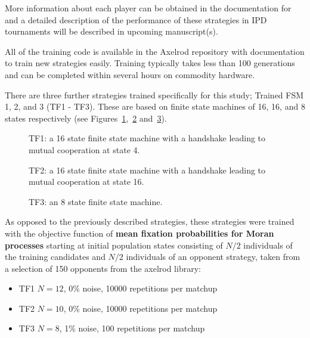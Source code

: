 \documentclass{article}
\begin{document}
More information about each player can be obtained in the documentation for
\cite{axelrodproject} and a detailed description of the performance
 of these strategies in IPD tournaments will be described in upcoming manuscript(s).

All of the training code is available in the
Axelrod repository with documentation to train new strategies easily. Training
typically takes less than 100 generations and can be completed within several
hours on commodity hardware.

There are three further strategies trained specifically for this study; Trained
FSM 1, 2, and 3 (TF1 - TF3). These are based on finite state machines of 16, 16,
and 8 states respectively (see Figures~\ref{fig:tf1},~\ref{fig:tf2}
and~\ref{fig:tf3}).


\begin{figure}[!hbtp]
    \centering
    
    \caption{TF1: a 16 state finite state machine with a handshake leading to
    mutual cooperation at state 4.}
    \label{fig:tf1}
\end{figure}


\begin{figure}[!hbtp]
    \centering
    
    \caption{TF2: a 16 state finite state machine with a handshake leading to
    mutual cooperation at state 16.}
    \label{fig:tf2}
\end{figure}


\begin{figure}[!hbtp]
    \centering
    
    \caption{TF3: an 8 state finite state machine.}
    \label{fig:tf3}
\end{figure}

As opposed to the previously described strategies, these strategies were trained
with the objective function of \textbf{mean fixation probabilities for Moran
processes} starting at initial population states consisting of \(N/2\)
individuals of the training candidates and \(N/2\) individuals of an opponent
strategy, taken from a selection of 150 opponents from the axelrod library:

\begin{itemize}
	\item TF1 \(N=12\), 0\% noise, 10000 repetitions per matchup
	\item TF2 \(N=10\), 0\% noise, 10000 repetitions per matchup
	\item TF3 \(N=8\), 1\% noise, 100 repetitions per matchup
\end{itemize}
\end{document}

